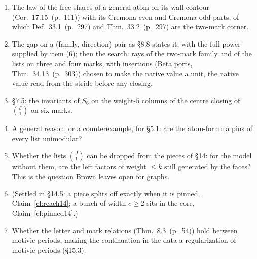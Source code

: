\documentclass[11pt]{article}
\newcommand{\cE}{\mathcal E}
\newcommand{\hb}[2]{#1~(p.~#2)}   %
\theoremstyle{plain}
\theoremstyle{remark}
\begin{document}
\begin{enumerate}[label=(\arabic*)]
\item The law of the free shares of a general atom on its wall contour (Cor.~\hb{17.15}{111}) with its Cremona-even and Cremona-odd parts, of which Def.~\hb{33.1}{297} and Thm.~\hb{33.2}{297} are the two-mark corner.
\item The gap on a (family, direction) pair as \S8.8 states it, with the full power supplied by item (6); then the search: rays of the two-mark family and of the lists on three and four marks, with insertions (Beta ports, Thm.~\hb{34.13}{303}) chosen to make the native value a unit, the native value read from the stride before any closing.
\item \S7.5: the invariants of $S_6$ on the weight-$5$ columns of the centre closing of $\binom{\cE}1$ on six marks.
\item A general reason, or a counterexample, for \S5.1: are the atom-formula pins of every list unimodular?
\item Whether the lists $\binom J1$ can be dropped from the pieces of \S14: for the model without them, are the left factors of weight $\le k$ still generated by the faces? This is the question Brown leaves open for graphs.
\item (Settled in \S14.5: a piece splits off exactly when it is pinned, Claim~\ref{cl:reach14}; a bunch of width $c\ge2$ sits in the core, Claim~\ref{cl:pinned14}.)
\item Whether the letter and mark relations (Thm.~\hb{8.3}{54}) hold between motivic periods, making the continuation in the data a regularization of motivic periods (\S15.3).
\end{enumerate}
\end{document}
